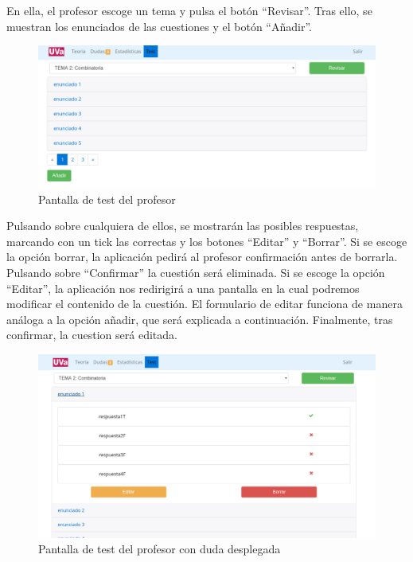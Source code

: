 \documentclass[openright,twoside,10pt]{book}
\begin{document}
    En ella, el profesor escoge un tema y pulsa el botón \enquote{Revisar}.
    Tras ello, se muestran los enunciados de las cuestiones y el botón
    \enquote{Añadir}.
    
    \begin{figure}[H]
        \begin{center}
            \includegraphics[width=\textwidth]{img/manual/profesor-test2.png}
        \end{center}
        \caption{Pantalla de test del profesor}
    \end{figure}
    
    Pulsando sobre cualquiera de ellos, se mostrarán las posibles
    respuestas, marcando con un tick las correctas y los botones
    \enquote{Editar} y \enquote{Borrar}. Si se escoge la opción borrar, la
    aplicación pedirá al profesor confirmación antes de borrarla. Pulsando
    sobre \enquote{Confirmar} la cuestión será eliminada. Si se escoge la
    opción \enquote{Editar}, la aplicación nos redirigirá a una pantalla en
    la cual podremos modificar el contenido de la cuestión. El formulario de
    editar funciona de manera análoga a la opción añadir, que será explicada
    a continuación. Finalmente, tras confirmar, la cuestion será editada.
    
    \begin{figure}[H]
        \begin{center}
            \includegraphics[width=\textwidth]{img/manual/profesor-test2-desplegada.png}
        \end{center}
        \caption{Pantalla de test del profesor con duda desplegada}
    \end{figure}
    
\end{document}
